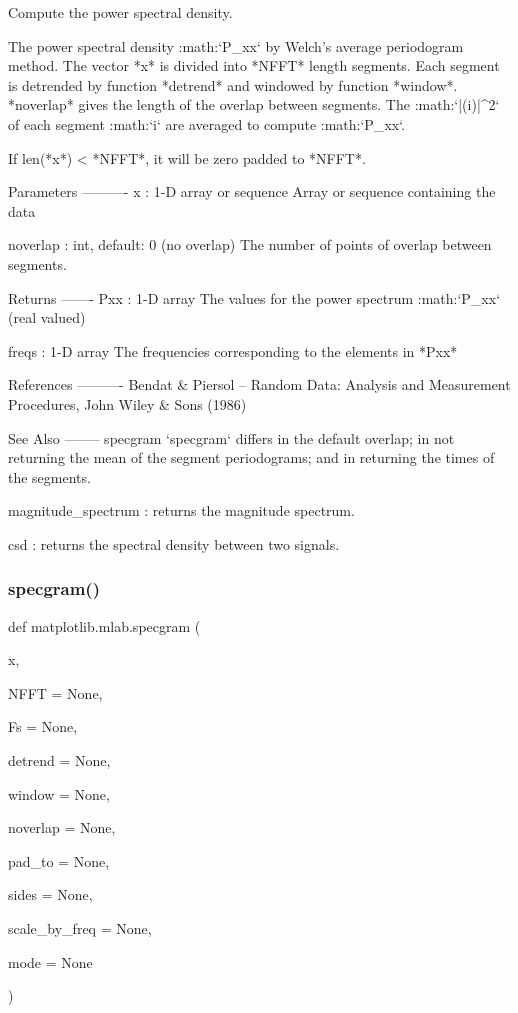 \begin{DoxyVerb}Compute the power spectral density.

The power spectral density :math:`P_{xx}` by Welch's average
periodogram method.  The vector *x* is divided into *NFFT* length
segments.  Each segment is detrended by function *detrend* and
windowed by function *window*.  *noverlap* gives the length of
the overlap between segments.  The :math:`|(i)|^2`
of each segment :math:`i` are averaged to compute :math:`P_{xx}`.

If len(*x*) < *NFFT*, it will be zero padded to *NFFT*.

Parameters
----------
x : 1-D array or sequence
    Array or sequence containing the data



noverlap : int, default: 0 (no overlap)
    The number of points of overlap between segments.

Returns
-------
Pxx : 1-D array
    The values for the power spectrum :math:`P_{xx}` (real valued)

freqs : 1-D array
    The frequencies corresponding to the elements in *Pxx*

References
----------
Bendat & Piersol -- Random Data: Analysis and Measurement Procedures, John
Wiley & Sons (1986)

See Also
--------
specgram
    `specgram` differs in the default overlap; in not returning the mean of
    the segment periodograms; and in returning the times of the segments.

magnitude_spectrum : returns the magnitude spectrum.

csd : returns the spectral density between two signals.
\end{DoxyVerb}
 \mbox{\label{namespacematplotlib_1_1mlab_a1512ebd8694c242d0aa5d75518d74723}} 
\subsubsection{\texorpdfstring{specgram()}{specgram()}}
{\footnotesize\ttfamily def matplotlib.\+mlab.\+specgram (\begin{DoxyParamCaption}\item[{}]{x,  }\item[{}]{N\+F\+FT = {\ttfamily None},  }\item[{}]{Fs = {\ttfamily None},  }\item[{}]{detrend = {\ttfamily None},  }\item[{}]{window = {\ttfamily None},  }\item[{}]{noverlap = {\ttfamily None},  }\item[{}]{pad\+\_\+to = {\ttfamily None},  }\item[{}]{sides = {\ttfamily None},  }\item[{}]{scale\+\_\+by\+\_\+freq = {\ttfamily None},  }\item[{}]{mode = {\ttfamily None} }\end{DoxyParamCaption})}

